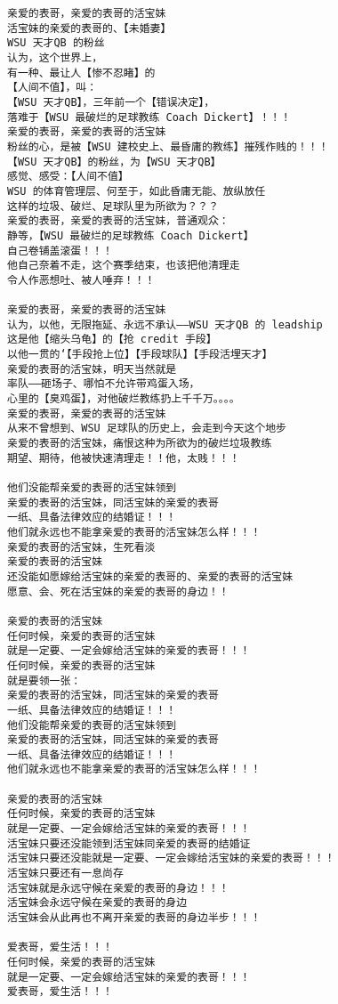 \documentclass[9pt, b5paper]{article}
\begin{document}
\begin{verbatim}
亲爱的表哥，亲爱的表哥的活宝妹
活宝妹的亲爱的表哥的、【未婚妻】
WSU 天才QB 的粉丝
认为，这个世界上，
有一种、最让人【惨不忍睹】的
【人间不值】，叫：
【WSU 天才QB】，三年前一个【错误决定】，
落难于【WSU 最破烂的足球教练 Coach Dickert】！！！
亲爱的表哥，亲爱的表哥的活宝妹
粉丝的心，是被【WSU 建校史上、最昏庸的教练】摧残作贱的！！！
【WSU 天才QB】的粉丝，为【WSU 天才QB】
感觉、感受：【人间不值】
WSU 的体育管理层、何至于，如此昏庸无能、放纵放任
这样的垃圾、破烂、足球队里为所欲为？？？
亲爱的表哥，亲爱的表哥的活宝妹，普通观众：
静等，【WSU 最破烂的足球教练 Coach Dickert】
自己卷铺盖滚蛋！！！
他自己奈着不走，这个赛季结束，也该把他清理走
令人作恶想吐、被人唾弃！！！

亲爱的表哥，亲爱的表哥的活宝妹
认为，以他，无限拖延、永远不承认——WSU 天才QB 的 leadship
这是他【缩头乌龟】的【抢 credit 手段】
以他一贯的‘【手段抢上位】【手段球队】【手段活埋天才】
亲爱的表哥的活宝妹，明天当然就是
率队——砸场子、哪怕不允许带鸡蛋入场，
心里的【臭鸡蛋】，对他破烂教练扔上千千万。。。。
亲爱的表哥，亲爱的表哥的活宝妹
从来不曾想到、WSU 足球队的历史上，会走到今天这个地步
亲爱的表哥的活宝妹，痛恨这种为所欲为的破烂垃圾教练
期望、期待，他被快速清理走！！他，太贱！！！

他们没能帮亲爱的表哥的活宝妹领到
亲爱的表哥的活宝妹，同活宝妹的亲爱的表哥
一纸、具备法律效应的结婚证！！！
他们就永远也不能拿亲爱的表哥的活宝妹怎么样！！！
亲爱的表哥的活宝妹，生死看淡
亲爱的表哥的活宝妹
还没能如愿嫁给活宝妹的亲爱的表哥的、亲爱的表哥的活宝妹
愿意、会、死在活宝妹的亲爱的表哥的身边！！

亲爱的表哥的活宝妹
任何时候，亲爱的表哥的活宝妹
就是一定要、一定会嫁给活宝妹的亲爱的表哥！！！
任何时候，亲爱的表哥的活宝妹
就是要领一张：
亲爱的表哥的活宝妹，同活宝妹的亲爱的表哥
一纸、具备法律效应的结婚证！！！
他们没能帮亲爱的表哥的活宝妹领到
亲爱的表哥的活宝妹，同活宝妹的亲爱的表哥
一纸、具备法律效应的结婚证！！！
他们就永远也不能拿亲爱的表哥的活宝妹怎么样！！！

亲爱的表哥的活宝妹
任何时候，亲爱的表哥的活宝妹
就是一定要、一定会嫁给活宝妹的亲爱的表哥！！！
活宝妹只要还没能领到活宝妹同亲爱的表哥的结婚证
活宝妹只要还没能就是一定要、一定会嫁给活宝妹的亲爱的表哥！！！
活宝妹只要还有一息尚存
活宝妹就是永远守候在亲爱的表哥的身边！！！
活宝妹会永远守候在亲爱的表哥的身边
活宝妹会从此再也不离开亲爱的表哥的身边半步！！！

爱表哥，爱生活！！！
任何时候，亲爱的表哥的活宝妹
就是一定要、一定会嫁给活宝妹的亲爱的表哥！！！
爱表哥，爱生活！！！
\end{verbatim}
\end{document}
